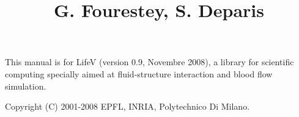 \documentclass[a4paper, 12pt, report]{lifestyle}
\title{\lifetitle{LifeV User Manual}
{G. Fourestey, S. Deparis}
}
\date{}
\begin{document}
\maketitle

\phantom{dummy text}
\vfill
This manual is for LifeV (version 0.9, Novembre 2008), a library for scientific computing specially aimed at fluid-structure interaction and blood flow simulation.

Copyright (C) 2001-2008 EPFL, INRIA, Polytechnico Di Milano.

\tableofcontents


\listoftables







\printindex
\end{document}
